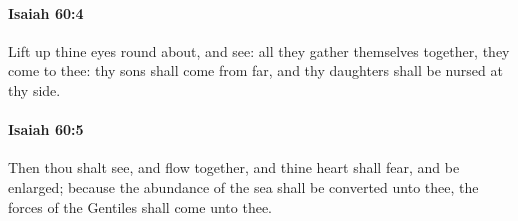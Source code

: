 		\paragraph{Isaiah 60:4} %
			\label{ISAIAH-60-4}

			Lift up thine eyes round about, and see: all they gather themselves together, they come to thee: thy sons shall come from far, and thy daughters shall be nursed at thy side.


		\paragraph{Isaiah 60:5} %
			\label{ISAIAH-60-5}

			Then thou shalt see, and flow together, and thine heart shall fear, and be enlarged; because the abundance of the sea shall be converted unto thee, the forces of the Gentiles shall come unto thee.


